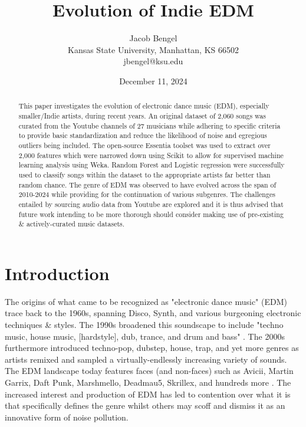 \documentclass[article,pdftex,12pt,a4paper]{article}
\begin{document}
\title{Evolution of Indie EDM}

\author{Jacob Bengel \\ \small Kansas State University, Manhattan, KS 66502 \\ \small jbengel@ksu.edu}

\date{\small December 11, 2024}

\maketitle

\begin{abstract}
This paper investigates the evolution of electronic dance music (EDM), especially smaller/Indie artists, during recent years. An original dataset of 2,060 songs was curated from the Youtube channels of 27 musicians while adhering to specific criteria to provide basic standardization and reduce the likelihood of noise and egregious outliers being included. The open-source Essentia toolset was used to extract over 2,000 features which were narrowed down using Scikit to allow for supervised machine learning analysis using Weka. Random Forest and Logistic regression were successfully used to classify songs within the dataset to the appropriate artists far better than random chance. The genre of EDM was observed to have evolved across the span of 2010-2024 while providing for the continuation of various subgenres. The challenges entailed by sourcing audio data from Youtube are explored and it is thus advised that future work intending to be more thorough should consider making use of pre-existing \& actively-curated music datasets.
\end{abstract}


\section{Introduction}
The origins of what came to be recognized as "electronic dance music" (EDM) trace back to the 1960s, spanning Disco, Synth, and various burgeoning electronic techniques \& styles. The 1990s broadened this soundscape to include "techno music, house music, [hardstyle], dub, trance, and drum and bass" \citep{lafs2017}. The 2000s furthermore introduced techno-pop, dubstep, house, trap, and yet more genres as artists remixed and sampled a virtually-endlessly increasing variety of sounds. The EDM landscape today features faces (and non-faces) such as Avicii, Martin Garrix, Daft Punk, Marshmello, Deadmau5, Skrillex, and hundreds more \citep{ranker2024}. The increased interest and production of EDM has led to contention over what it is that specifically defines the genre whilst others may scoff and dismiss it as an innovative form of noise pollution.
\end{document}
